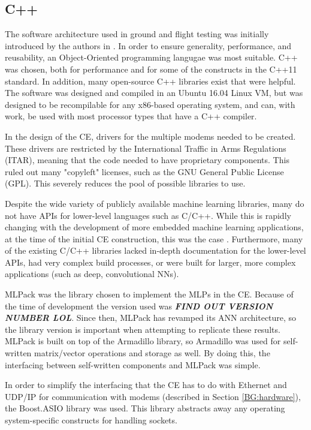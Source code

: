 \subsection{C++}
\par The software architecture used in ground and flight testing was initially introduced by the authors in \cite{placeholderCitation}. In order to ensure generality, performance, and reusability, an Object-Oriented programming langugae was most suitable. C++ was chosen, both for performance and for some of the constructs in the C++11 standard. In addition, many open-source C++ libraries exist that were helpful. The software was designed and compiled in an Ubuntu 16.04 Linux VM, but was designed to be recompilable for any x86-based operating system, and can, with work, be used with most processor types that have a C++ compiler.
\par In the design of the CE, drivers for the multiple modems needed to be created. These drivers are restricted by the International Traffic in Arms Regulations (ITAR), meaning that the code needed to have proprietary components. This ruled out many "copyleft" licenses, such as the GNU General Public License (GPL). This severely reduces the pool of possible libraries to use. 
\par Despite the wide variety of publicly available machine learning libraries, many do not have APIs for lower-level languages such as C/C++. While this is rapidly changing with the development of more embedded machine learning applications, at the time of the initial CE construction, this was the case \cite{tim_paper}. Furthermore, many of the existing C/C++ libraries lacked in-depth documentation for the lower-level APIs, had very complex build processes, or were built for larger, more complex applications (such as deep, convolutional NNs). 
\par MLPack \cite{cite_MLPAck_lol} was the library chosen to implement the MLPs in the CE. Because of the time of development the version used was \textbf{\textit{FIND OUT VERSION NUMBER LOL}}. Since then, MLPack has revamped its ANN architecture, so the library version is important when attempting to replicate these results. MLPack is built on top of the Armadillo \cite{cite_armadillo_lol} library, so Armadillo was used for self-written matrix/vector operations and storage as well. By doing this, the interfacing between self-written components and MLPack was simple. 
\par In order to simplify the interfacing that the CE has to do with Ethernet and UDP/IP for communication with modems (described in Section \ref{BG:hardware}), the Boost.ASIO \cite{cite_boostasio_lol} library was used. This library abstracts away any operating system-specific constructs for handling sockets.
